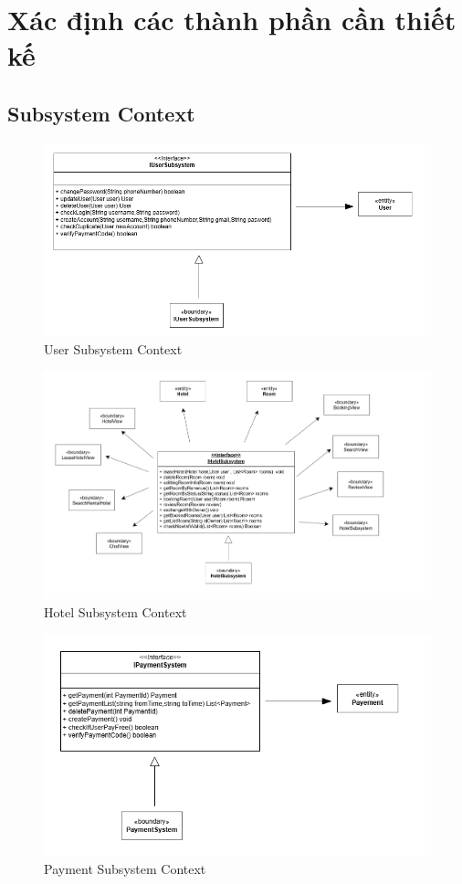 \section{Xác định các thành phần cần thiết kế}
\subsection{Subsystem Context}
\begin{figure}[H]
    \centering
    \includegraphics[width=\textwidth]{img3.1/userSubSystem(SubSystemContext).png} 
    \caption{User Subsystem Context}
\end{figure}

\begin{figure}[H]
    \centering
    \includegraphics[width=\textwidth]{img3.1/hotelSubSystem(SubSystemContext).png}
    \caption{Hotel Subsystem Context}
\end{figure}

\begin{figure}[H]
    \centering
    \includegraphics[width=\textwidth]{img3.1/paymentSy(SubSystemContext).png} 
    \caption{Payment Subsystem Context}
\end{figure}

